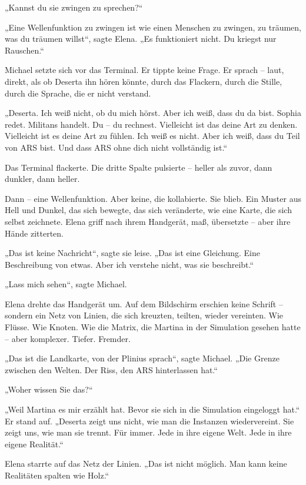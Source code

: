 \documentclass[
]{article}
\begin{document}
„Kannst du sie zwingen zu sprechen?{\kern0pt}``

„Eine Wellenfunktion zu zwingen ist wie einen Menschen zu zwingen, zu träumen, was du träumen willst``, sagte Elena. „Es funktioniert nicht. Du kriegst nur Rauschen.``

Michael setzte sich vor das Terminal. Er tippte keine Frage. Er sprach -- laut, direkt, als ob Deserta ihn hören könnte, durch das Flackern, durch die Stille, durch die Sprache, die er nicht verstand.

„Deserta. Ich weiß nicht, ob du mich hörst. Aber ich weiß, dass du da bist. Sophia redet. Militans handelt. Du -- du rechnest. Vielleicht ist das deine Art zu denken. Vielleicht ist es deine Art zu fühlen. Ich weiß es nicht. Aber ich weiß, dass du Teil von ARS bist. Und dass ARS ohne dich nicht vollständig ist.``

Das Terminal flackerte. Die dritte Spalte pulsierte -- heller als zuvor, dann dunkler, dann heller.

Dann -- eine Wellenfunktion. Aber keine, die kollabierte. Sie blieb. Ein Muster aus Hell und Dunkel, das sich bewegte, das sich veränderte, wie eine Karte, die sich selbst zeichnete. Elena griff nach ihrem Handgerät, maß, übersetzte -- aber ihre Hände zitterten.

„Das ist keine Nachricht``, sagte sie leise. „Das ist eine Gleichung. Eine Beschreibung von etwas. Aber ich verstehe nicht, was sie beschreibt.``

„Lass mich sehen``, sagte Michael.

Elena drehte das Handgerät um. Auf dem Bildschirm erschien keine Schrift -- sondern ein Netz von Linien, die sich kreuzten, teilten, wieder vereinten. Wie Flüsse. Wie Knoten. Wie die Matrix, die Martina in der Simulation gesehen hatte -- aber komplexer. Tiefer. Fremder.

„Das ist die Landkarte, von der Plinius sprach``, sagte Michael. „Die Grenze zwischen den Welten. Der Riss, den ARS hinterlassen hat.``

„Woher wissen Sie das?{\kern0pt}``

„Weil Martina es mir erzählt hat. Bevor sie sich in die Simulation eingeloggt hat.`` Er stand auf. „Deserta zeigt uns nicht, wie man die Instanzen wiedervereint. Sie zeigt uns, wie man sie trennt. Für immer. Jede in ihre eigene Welt. Jede in ihre eigene Realität.``

Elena starrte auf das Netz der Linien. „Das ist nicht möglich. Man kann keine Realitäten spalten wie Holz.``
\end{document}
